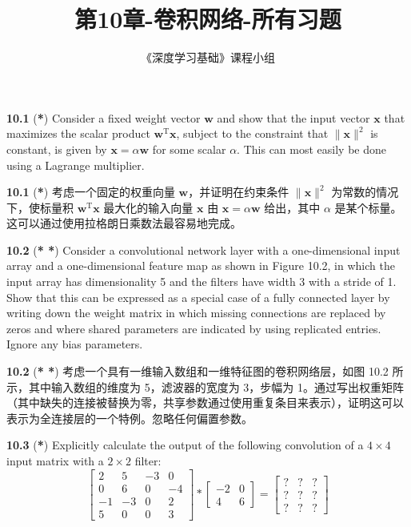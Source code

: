 \documentclass{article}
\title{第10章-卷积网络-所有习题}
\author{《深度学习基础》课程小组}
\begin{document}
\maketitle

\textbf{10.1} (\textbf{*}) Consider a fixed weight vector $\mathbf{w}$ and show that the input vector $\mathbf{x}$ that maximizes the scalar product $\mathbf{w}^\mathrm{T}\mathbf{x}$, subject to the constraint that $\|\mathbf{x}\|^2$ is constant, is given by $\mathbf{x} = \alpha \mathbf{w}$ for some scalar $\alpha$. This can most easily be done using a Lagrange multiplier.

\textbf{10.1} (\textbf{*}) 考虑一个固定的权重向量 $\mathbf{w}$，并证明在约束条件 $\|\mathbf{x}\|^2$ 为常数的情况下，使标量积 $\mathbf{w}^\mathrm{T}\mathbf{x}$ 最大化的输入向量 $\mathbf{x}$ 由 $\mathbf{x} = \alpha \mathbf{w}$ 给出，其中 $\alpha$ 是某个标量。这可以通过使用拉格朗日乘数法最容易地完成。

\textbf{10.2} (\textbf{* *}) Consider a convolutional network layer with a one-dimensional input array and a one-dimensional feature map as shown in Figure 10.2, in which the input array has dimensionality 5 and the filters have width 3 with a stride of 1. Show that this can be expressed as a special case of a fully connected layer by writing down the weight matrix in which missing connections are replaced by zeros and where shared parameters are indicated by using replicated entries. Ignore any bias parameters.

\textbf{10.2} (\textbf{* *}) 考虑一个具有一维输入数组和一维特征图的卷积网络层，如图 10.2 所示，其中输入数组的维度为 5，滤波器的宽度为 3，步幅为 1。通过写出权重矩阵（其中缺失的连接被替换为零，共享参数通过使用重复条目来表示），证明这可以表示为全连接层的一个特例。忽略任何偏置参数。

\textbf{10.3} (\textbf{*}) Explicitly calculate the output of the following convolution of a $4 \times 4$ input matrix with a $2 \times 2$ filter:
\[
\begin{bmatrix}
2 & 5 & -3 & 0 \\
0 & 6 & 0 & -4 \\
-1 & -3 & 0 & 2 \\
5 & 0 & 0 & 3
\end{bmatrix}
*
\begin{bmatrix}
-2 & 0 \\
4 & 6
\end{bmatrix}
=
\begin{bmatrix}
? & ? & ? \\
? & ? & ? \\
? & ? & ?
\end{bmatrix}
\]
\end{document}
